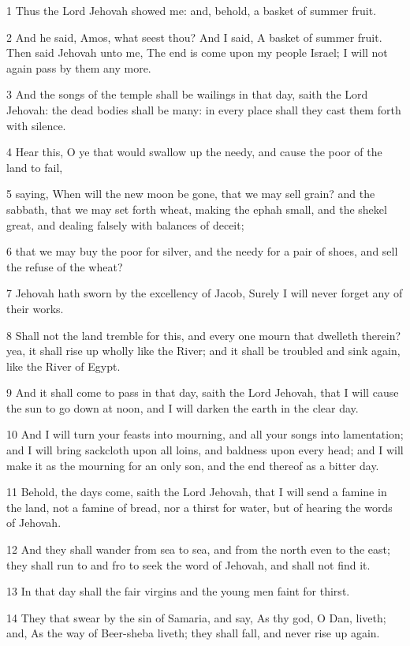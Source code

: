 \par 1 Thus the Lord Jehovah showed me: and, behold, a basket of summer fruit.
\par 2 And he said, Amos, what seest thou? And I said, A basket of summer fruit. Then said Jehovah unto me, The end is come upon my people Israel; I will not again pass by them any more.
\par 3 And the songs of the temple shall be wailings in that day, saith the Lord Jehovah: the dead bodies shall be many: in every place shall they cast them forth with silence.
\par 4 Hear this, O ye that would swallow up the needy, and cause the poor of the land to fail,
\par 5 saying, When will the new moon be gone, that we may sell grain? and the sabbath, that we may set forth wheat, making the ephah small, and the shekel great, and dealing falsely with balances of deceit;
\par 6 that we may buy the poor for silver, and the needy for a pair of shoes, and sell the refuse of the wheat?
\par 7 Jehovah hath sworn by the excellency of Jacob, Surely I will never forget any of their works.
\par 8 Shall not the land tremble for this, and every one mourn that dwelleth therein? yea, it shall rise up wholly like the River; and it shall be troubled and sink again, like the River of Egypt.
\par 9 And it shall come to pass in that day, saith the Lord Jehovah, that I will cause the sun to go down at noon, and I will darken the earth in the clear day.
\par 10 And I will turn your feasts into mourning, and all your songs into lamentation; and I will bring sackcloth upon all loins, and baldness upon every head; and I will make it as the mourning for an only son, and the end thereof as a bitter day.
\par 11 Behold, the days come, saith the Lord Jehovah, that I will send a famine in the land, not a famine of bread, nor a thirst for water, but of hearing the words of Jehovah.
\par 12 And they shall wander from sea to sea, and from the north even to the east; they shall run to and fro to seek the word of Jehovah, and shall not find it.
\par 13 In that day shall the fair virgins and the young men faint for thirst.
\par 14 They that swear by the sin of Samaria, and say, As thy god, O Dan, liveth; and, As the way of Beer-sheba liveth; they shall fall, and never rise up again.

